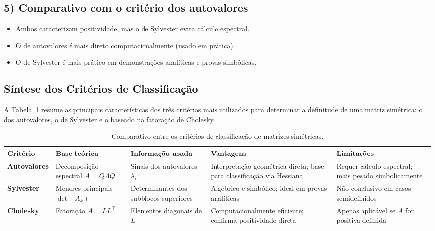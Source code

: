 \documentclass[9pt,a4paper]{extarticle}
\begin{document}
\subsection*{5) Comparativo com o crit\'erio dos autovalores}
\begin{itemize}
  \item Ambos caracterizam positividade, mas o de Sylvester evita c\'alculo espectral.
  \item O de autovalores \'e mais direto computacionalmente (usado em pr\'atica).
  \item O de Sylvester \'e mais pr\'atico em demonstra\c c\~oes anal\'iticas e provas simb\'olicas.
\end{itemize}

\subsection*{S\'intese dos Crit\'erios de Classifica\c c\~ao}

A Tabela~\ref{tab:comparacao-criterios} resume as principais caracter\'isticas dos tr\^es crit\'erios mais utilizados para determinar a definitude de uma matriz sim\'etrica: o dos autovalores, o de Sylvester e o baseado na fatora\c c\~ao de Cholesky.

\begin{table}[h]
\centering
\small
\setlength{\tabcolsep}{5pt}
\renewcommand{\arraystretch}{1.2}
\begin{tabularx}{\textwidth}{@{}lXXXX@{}}
\toprule
\textbf{Crit\'erio} &
\textbf{Base te\'orica} &
\textbf{Informa\c c\~ao usada} &
\textbf{Vantagens} &
\textbf{Limita\c c\~oes} \\
\midrule
\textbf{Autovalores} &
Decomposi\c c\~ao espectral $A = Q\Lambda Q^\top$ &
Sinais dos autovalores $\lambda_i$ &
Interpreta\c c\~ao geom\'etrica direta; base para classifica\c c\~ao via Hessiana &
Requer c\'alculo espectral; mais pesado simbolicamente \\

\textbf{Sylvester} &
Menores principais $\det(A_k)$ &
Determinantes dos subblocos superiores &
Alg\'ebrico e simb\'olico; ideal em provas anal\'iticas &
N\~ao conclusivo em casos semidefinidos \\

\textbf{Cholesky} &
Fatora\c c\~ao $A = L L^\top$ &
Elementos diagonais de $L$ &
Computacionalmente eficiente; confirma positividade direta &
Apenas aplic\'avel se $A$ for positiva definida \\
\bottomrule
\end{tabularx}
\caption{Comparativo entre os crit\'erios de classifica\c c\~ao de matrizes sim\'etricas.}
\label{tab:comparacao-criterios}
\end{table}
\end{document}
